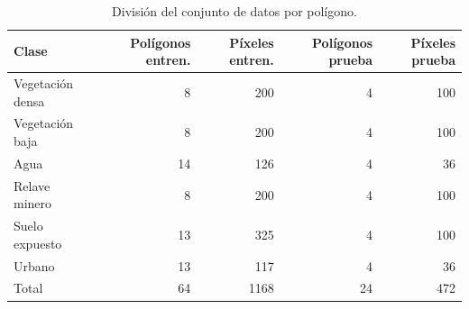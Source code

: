 \begin{table}[htbp]
 \centering
 \caption{División del conjunto de datos por polígono.}
 \label{tab:division}
 \begin{tabular}{lrrrr}
  \toprule
  Clase & Polígonos entren. & Píxeles entren. & Polígonos prueba & Píxeles prueba \\
  \midrule
  Vegetación densa & 8 & 200 & 4 & 100 \\
  Vegetación baja & 8 & 200 & 4 & 100 \\
  Agua & 14 & 126 & 4 & 36 \\
  Relave minero & 8 & 200 & 4 & 100 \\
  Suelo expuesto & 13 & 325 & 4 & 100 \\
  Urbano & 13 & 117 & 4 & 36 \\
  \midrule
  Total & 64 & 1168 & 24 & 472 \\
  \bottomrule
 \end{tabular}
\end{table}
